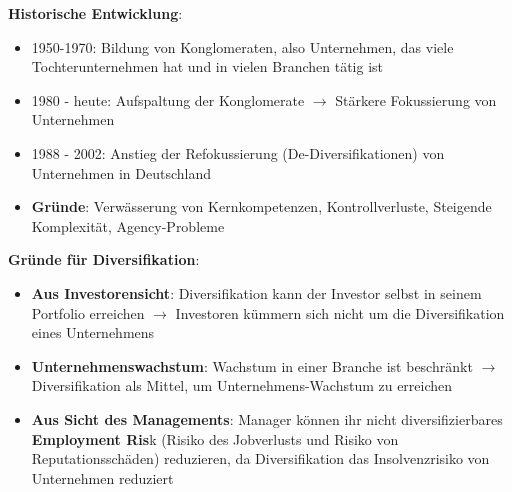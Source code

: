\textbf{Historische Entwicklung}: 
\begin{itemize}
	\item 1950-1970: Bildung von Konglomeraten, also Unternehmen, das viele Tochterunternehmen hat und in vielen Branchen tätig ist
	\item 1980 - heute: Aufspaltung der Konglomerate $\rightarrow$ Stärkere Fokussierung von Unternehmen
	\item 1988 - 2002: Anstieg der Refokussierung (De-Diversifikationen) von Unternehmen in Deutschland
	\item \textbf{Gründe}: Verwässerung von Kernkompetenzen, Kontrollverluste, Steigende Komplexität, Agency-Probleme
\end{itemize}
\bigskip
\textbf{Gründe für Diversifikation}: 
\begin{itemize}
	\item \textbf{Aus Investorensicht}: Diversifikation kann der Investor selbst in seinem Portfolio erreichen $\rightarrow$ Investoren kümmern sich nicht um die Diversifikation eines Unternehmens
	\item \textbf{Unternehmenswachstum}: Wachstum in einer Branche ist beschränkt $\rightarrow$ Diversifikation als Mittel, um Unternehmens-Wachstum zu erreichen
	\item \textbf{Aus Sicht des Managements}: Manager können ihr nicht diversifizierbares \textbf{Employment Ris}k (Risiko des Jobverlusts und Risiko von Reputationsschäden)
	reduzieren, da Diversifikation das Insolvenzrisiko von Unternehmen reduziert
\end{itemize}

